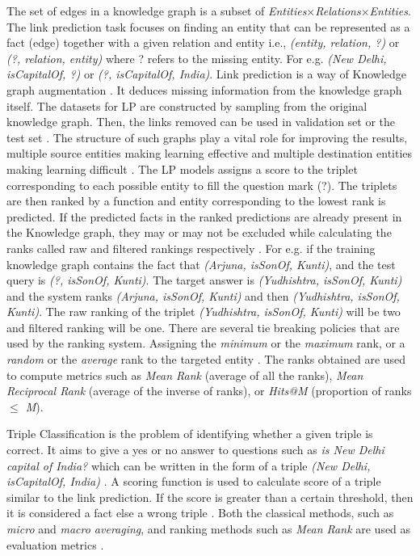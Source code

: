 The set of edges in a knowledge graph is a subset of \textit{Entities$\times$Relations$\times$Entities}. The link prediction task focuses on finding an entity that can be represented as a fact (edge) together with a given relation and entity i.e., \textit{(entity, relation, ?)} or \textit{(?, relation, entity)} where ? refers to the missing entity. For e.g. \textit{(New Delhi, isCapitalOf, ?)} or \textit{(?, isCapitalOf, India)}. Link prediction is a way of Knowledge graph augmentation . It deduces missing information from the knowledge graph itself. 
\noindent
The datasets for LP are constructed by sampling from the original knowledge graph. Then, the links removed can be used in validation set or the test set . The structure of such graphs play a vital role 
for improving the results, multiple source entities making learning effective and multiple destination entities making learning difficult .
\noindent
The LP models assigns a score to the triplet corresponding to each possible entity to fill the question mark (?). The triplets are then ranked by a function and entity corresponding to the lowest rank is predicted. If the predicted facts in the ranked predictions are already present in the Knowledge graph, they may or may not be excluded while calculating the ranks called raw and filtered rankings respectively . For e.g. if the training knowledge graph contains the fact that \textit{(Arjuna, isSonOf, Kunti)}, and the test query is \textit{(?, isSonOf, Kunti)}. The target answer is \textit{(Yudhishtra, isSonOf, Kunti)} and the system ranks  \textit{(Arjuna, isSonOf, Kunti)} and then \textit{(Yudhishtra, isSonOf, Kunti)}. The raw ranking of the triplet \textit{(Yudhishtra, isSonOf, Kunti)} will be two and filtered ranking will be one. 
\noindent
There are several tie breaking policies that are used by the ranking system. Assigning the \textit{minimum} or the \textit{
maximum} rank, or a \textit{random} or the \textit{average} rank to the targeted entity .
\noindent
The ranks obtained are used to compute metrics such as \textit{Mean Rank} (average of all the ranks), \textit{Mean Reciprocal Rank} (average of the inverse of ranks), or \textit{Hits@M} (proportion of ranks \textit{$\leq$ M}).

Triple Classification is the problem of identifying whether a given triple is correct. It aims to give a yes or no answer to questions such as \textit{is New Delhi capital of India?} which can be written in the form of a triple \textit{(New Delhi, isCapitalOf, India)} .
\noindent
A scoring function is used to calculate score of a triple similar to the link prediction. If the score is greater than a certain threshold, then it is considered a fact else a wrong triple . 
\noindent
Both the classical methods, such as \textit{micro} and \textit{macro averaging}, and ranking methods such as \textit{Mean Rank} are used as evaluation metrics .

